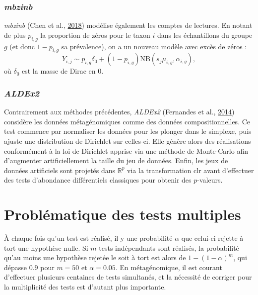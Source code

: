 \documentclass[12pt,a4paper]{reedthesis}
\newcommand \RR {\mathbb{R}}
\theoremstyle{definition}
\theoremstyle{definition}
\theoremstyle{definition}
\theoremstyle{remark}
\begin{document}
\hypertarget{mbzinb}{%
\subsubsection*{\texorpdfstring{\emph{mbzinb}}{mbzinb}}\label{mbzinb}}

\emph{mbzinb} (Chen et al., \protect\hyperlink{ref-chen2018omnibus}{2018}) modélise également les comptes de lectures. En notant de plus \(p_{i,g}\) la proportion de zéros pour le taxon \(i\) dans les échantillons du groupe \(g\) (et donc \(1 - p_{i,g}\) sa prévalence), on a un nouveau modèle avec excès de zéros :
\begin{equation*}
Y_{i,j} \sim p_{i,g} \delta_0 + (1-p_{i,g}) \text{NB}\left(s_j\mu_{i,g},\alpha_{i,g}\right),
\end{equation*}
où \(\delta_0\) est la masse de Dirac en \(0\).

\hypertarget{aldex2}{%
\subsubsection*{\texorpdfstring{\emph{ALDEx2}}{ALDEx2}}\label{aldex2}}

Contrairement aux méthodes précédentes, \emph{ALDEx2} (Fernandes et al., \protect\hyperlink{ref-fernandes2014unifying}{2014}) considère les données métagénomiques comme des données compositionnelles. Ce test commence par normaliser les données pour les plonger dans le simplexe, puis ajuste une distribution de Dirichlet sur celles-ci. Elle génère alors des réalisations conformément à la loi de Dirichlet apprise via une méthode de Monte-Carlo afin d'augmenter artificiellement la taille du jeu de données. Enfin, les jeux de données artificiels sont projetés dans \(\RR^p\) via la transformation \(\text{clr}\) avant d'effectuer des tests d'abondance différentiels classiques pour obtenir des \(p\)-valeurs.

\hypertarget{probluxe9matique-des-tests-multiples}{%
\section{Problématique des tests multiples}\label{probluxe9matique-des-tests-multiples}}

À chaque fois qu'un test est réalisé, il y une probabilité \(\alpha\) que celui-ci rejette à tort une hypothèse nulle. Si \(m\) tests indépendants sont réalisés, la probabilité qu'au moins une hypothèse rejetée le soit à tort est alors de \(1-(1-\alpha)^m\), qui dépasse \(0.9\) pour \(m = 50\) et \(\alpha = 0.05\). En métagénomique, il est courant d'effectuer plusieurs centaines de tests simultanés, et la nécessité de corriger pour la multiplicité des tests est d'autant plus importante.
\end{document}
